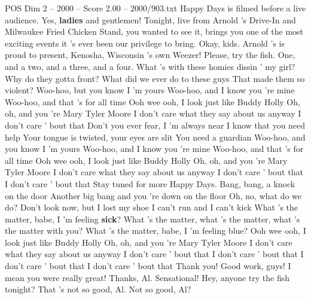 \begin{textsample}{POS Dim 2 – 2000 – Score 2.00 – 2000/903.txt}  \label{ex:f2_pos_011}
Happy Days is filmed before a live audience.
Yes, \textbf{ladies} and gentlemen!
Tonight, live from Arnold 's Drive-In and Milwaukee Fried Chicken Stand, you wanted to see it, brings you one of the most exciting events it 's ever been our privilege to bring.
Okay, kids.
Arnold 's is proud to present, Kenosha, Wisconsin 's own Weezer!
Please, try the fish.
One, and a two, and a three, and a four.
What 's with these homies dissin ' my girl?
Why do they gotta front?
What did we ever do to these guys That made them so violent?
Woo-hoo, but you know I 'm yours Woo-hoo, and I know you 're mine Woo-hoo, and that 's for all time Ooh wee ooh, I look just like Buddy Holly Oh, oh, and you 're Mary Tyler Moore I don't care what they say about us anyway I don't care ' bout that Don't you ever fear, I 'm always near I know that you need help Your tongue is twisted, your eyes are slit You need a guardian Woo-hoo, and you know I 'm yours Woo-hoo, and I know you 're mine Woo-hoo, and that 's for all time Ooh wee ooh, I look just like Buddy Holly Oh, oh, and you 're Mary Tyler Moore I don't care what they say about us anyway I don't care ' bout that I don't care ' bout that Stay tuned for more Happy Days.
Bang, bang, a knock on the door Another big bang and you 're down on the floor Oh, no, what do we do?
Don't look now, but I lost my shoe I can't run and I can't kick What 's the matter, babe, I 'm feeling \textbf{sick}?
What 's the matter, what 's the matter, what 's the matter with you?
What 's the matter, babe, I 'm feeling blue?
Ooh wee ooh, I look just like Buddy Holly Oh, oh, and you 're Mary Tyler Moore I don't care what they say about us anyway I don't care ' bout that I don't care ' bout that I don't care ' bout that I don't care ' bout that Thank you!
Good work, guys!
I mean you were really great!
Thanks, Al.
Sensational!
Hey, anyone try the fish tonight?
That 's not so good, Al.
Not so good, Al?

\end{textsample}
